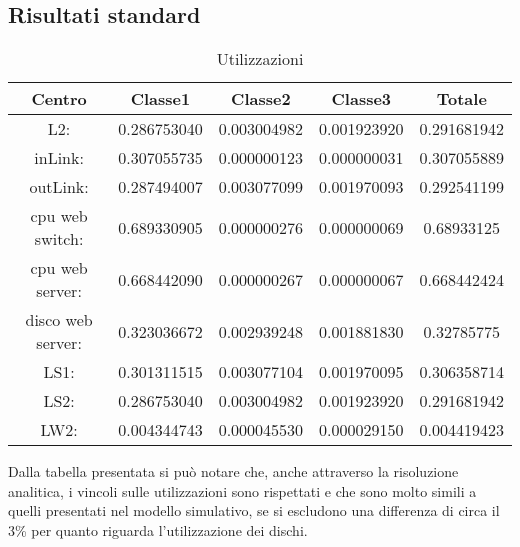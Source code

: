 \subsection{Risultati standard}
\begin{table}[htbp]
\begin{center}
\begin{tabular}{|c|c|c|c|c|}
\hline
Centro &Classe1 &Classe2 &Classe3 &Totale\\
\hline
\hline
L2: &0.286753040 &0.003004982 &0.001923920 &0.291681942\\
\hline
inLink: &0.307055735 &0.000000123 &0.000000031 &0.307055889\\
\hline
outLink: &0.287494007 &0.003077099 &0.001970093 &0.292541199\\
\hline
cpu web switch: &0.689330905 &0.000000276 &0.000000069 &0.68933125\\
\hline
cpu web server: &0.668442090 &0.000000267 &0.000000067 &0.668442424\\
\hline
disco web server: &0.323036672 &0.002939248 &0.001881830 &0.32785775\\
\hline
LS1: &0.301311515 &0.003077104 &0.001970095 &0.306358714\\
\hline
LS2: &0.286753040 &0.003004982 &0.001923920 &0.291681942\\
\hline
LW2: &0.004344743 &0.000045530 &0.000029150 &0.004419423\\
\hline
\end{tabular}
\end{center}
\caption{Utilizzazioni}
\label{utilizzazioni}
\end{table}
Dalla tabella presentata si può notare che, anche attraverso la risoluzione analitica, i vincoli sulle utilizzazioni sono rispettati e che sono molto simili a quelli presentati nel modello simulativo, se si escludono una differenza di circa il 3\% per quanto riguarda l'utilizzazione dei dischi.

